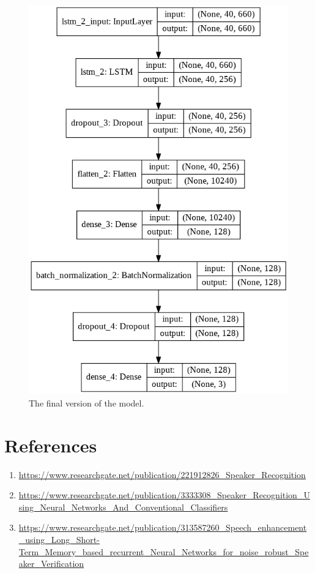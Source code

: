 \documentclass{article}
\begin{document}
	\begin{figure}
	\centering
	\includegraphics[width = \textwidth]{model}
	\caption{The final version of the model.}
	\label{fig:model}
	\end{figure}

\clearpage
\section*{References}
\begin{enumerate}
\item \url{https://www.researchgate.net/publication/221912826_Speaker_Recognition}
\item \url{https://www.researchgate.net/publication/3333308_Speaker_Recognition_Using_Neural_Networks_And_Conventional_Classifiers}
\item \url{https://www.researchgate.net/publication/313587260_Speech_enhancement_using_Long_Short-Term_Memory_based_recurrent_Neural_Networks_for_noise_robust_Speaker_Verification}
\end{enumerate}
\end{document}
